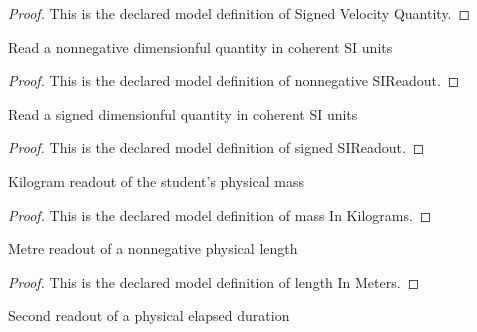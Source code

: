 \begin{proof}
  This is the declared model definition of Signed Velocity Quantity.
\end{proof}
\begin{definition}
  \label{def:physics:phyx-mini-0718:phyxminiproblems-problemphyxmini0718-nonnegativesireadout}
  Read a nonnegative dimensionful quantity in coherent SI units
\end{definition}
\begin{proof}
  This is the declared model definition of nonnegative SIReadout.
\end{proof}
\begin{definition}
  \label{def:physics:phyx-mini-0718:phyxminiproblems-problemphyxmini0718-signedsireadout}
  Read a signed dimensionful quantity in coherent SI units
\end{definition}
\begin{proof}
  This is the declared model definition of signed SIReadout.
\end{proof}
\begin{definition}
  \label{def:physics:phyx-mini-0718:phyxminiproblems-problemphyxmini0718-massinkilograms}
  Kilogram readout of the student's physical mass
\end{definition}
\begin{proof}
  This is the declared model definition of mass In Kilograms.
\end{proof}
\begin{definition}
  \label{def:physics:phyx-mini-0718:phyxminiproblems-problemphyxmini0718-lengthinmeters}
  Metre readout of a nonnegative physical length
\end{definition}
\begin{proof}
  This is the declared model definition of length In Meters.
\end{proof}
\begin{definition}
  \label{def:physics:phyx-mini-0718:phyxminiproblems-problemphyxmini0718-timeinseconds}
  Second readout of a physical elapsed duration
\end{definition}
